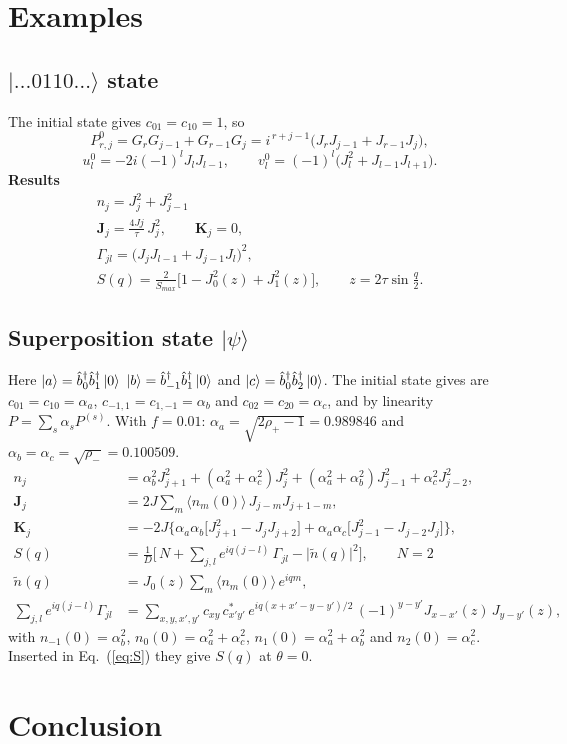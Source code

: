 \documentclass[a4paper, amsfonts, amssymb, amsmath, reprint, showkeys, nofootinbib ,twoside]{revtex4-2}
\begin{document}
\section{Examples} 
\subsection{$|\dots 0110\dots \rangle$ state}
The initial state gives $c_{01}=c_{10}=1$, so
\begin{equation}
P^0_{r,j}=G_rG_{j-1}+G_{r-1}G_j=i^{\,r+j-1}\big(J_rJ_{j-1}+J_{r-1}J_j\big),
\end{equation}
\begin{equation} 
u^0_l=-2i(-1)^lJ_lJ_{l-1},\qquad v^0_l=(-1)^l\big(J_l^2+J_{l-1}J_{l+1}\big).
\end{equation}
\textbf{Results}\\
\begin{align}
n_j=J_j^2+J_{j-1}^2  \\
\mathbf J_j=\frac{4Jj}{\tau}\,J_j^2,\qquad \mathbf K_j=0, \\
\Gamma_{jl}=\big(J_jJ_{l-1}+J_{j-1}J_l\big)^2,\\
S(q)=\frac{2}{S_{max}}\Big[1-J_0^2(z)+J_1^2(z)\Big],\qquad z=2\tau\sin\tfrac q2 . 
\end{align}

\subsection{Superposition state $|\psi\rangle$}
Here $\ket a= \hat b^\dagger_{0}\hat b^\dagger_{1}\ket0 $ $\ket b=\hat b^\dagger_{-1}\hat b^\dagger_{1}\ket0$ and $\ket c=\hat b^\dagger_{0}\hat b^\dagger_{2}\ket0$. The initial state gives are $c_{01}=c_{10}=\alpha_a$, $c_{-1,1}=c_{1,-1}=\alpha_b$ and $c_{02}=c_{20}=\alpha_c$, and by linearity $P=\sum_s\alpha_sP^{(s)}$. With $f=0.01$: $\alpha_a=\sqrt{2\rho_+-1}=0.989846$ and $\alpha_b=\alpha_c=\sqrt{\rho_-}=0.100509$. 
\begin{equation}
\begin{split}
n_j&=\alpha_b^2J_{j+1}^2+(\alpha_a^2+\alpha_c^2)J_j^2+(\alpha_a^2+\alpha_b^2)J_{j-1}^2+\alpha_c^2J_{j-2}^2,\\
\mathbf J_j&=2J\sum_m   \langle n_m(0) \rangle \,J_{j-m}J_{j+1-m},\\
\mathbf K_j&=-2J\Big\{\alpha_a\alpha_b\big[J_{j+1}^2-J_jJ_{j+2}\big]+\alpha_a\alpha_c\big[J_{j-1}^2-J_{j-2}J_j\big]\Big\},\\ 
S(q)&=\frac1D\Big[\,N+\sum_{j,l}e^{iq(j-l)}\,\Gamma_{jl}-\big|\tilde n(q)\big|^2\Big],\qquad N=2 \\
\tilde n(q)&=J_0(z)\sum_m  \langle n_m(0) \rangle  \,e^{iqm},\\
\sum_{j,l}e^{iq(j-l)}\Gamma_{jl}&=\sum_{x,y,x',y'}c_{xy}\,c^*_{x'y'}\,e^{iq(x+x'-y-y')/2}\,(-1)^{y-y'}J_{x-x'}(z)\,J_{y-y'}(z),
\end{split}
\end{equation}
with $n_{-1}(0)=\alpha_b^2$, $n_0(0)=\alpha_a^2+\alpha_c^2$, $n_1(0)=\alpha_a^2+\alpha_b^2$ and $n_2(0)=\alpha_c^2$. Inserted in Eq.~(\ref{eq:S}) they give $S(q)$ at $\theta=0$.



\section{Conclusion}




\appendix*

\end{document}
